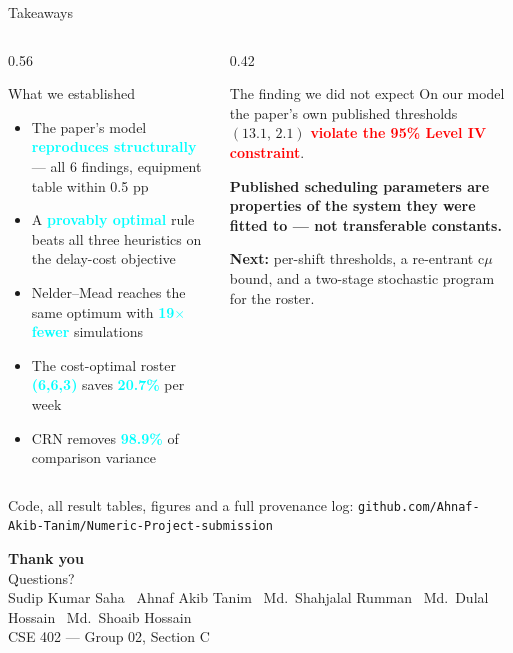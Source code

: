 \documentclass[aspectratio=169,11pt]{beamer}
\newcommand{\hl}[1]{\textcolor{deep}{\textbf{#1}}}
\newcommand{\good}[1]{\textcolor{aqua}{\textbf{#1}}}
\newcommand{\bad}[1]{\textcolor{red}{\textbf{#1}}}
\begin{document}
\begin{frame}{Takeaways}
\vspace{-0.2em}
\begin{columns}[T,onlytextwidth]
\begin{column}{0.56\textwidth}
\begin{block}{What we established}
\small
\begin{itemize}\setlength\itemsep{0.35em}
  \item The paper's model \good{reproduces structurally} --- all 6 findings,
        equipment table within 0.5 pp
  \item A \good{provably optimal} rule beats all three heuristics on the
        delay-cost objective
  \item Nelder--Mead reaches the same optimum with \good{19$\times$ fewer}
        simulations
  \item The cost-optimal roster \good{(6,6,3)} saves \good{20.7\%} per week
  \item CRN removes \good{98.9\%} of comparison variance
\end{itemize}
\end{block}
\end{column}
\begin{column}{0.42\textwidth}
\begin{block}{The finding we did not expect}
\small On our model the paper's own published thresholds $(13.1,\,2.1)$
\bad{violate the 95\% Level IV constraint}.
\vspace{0.4em}

\hl{Published scheduling parameters are properties of the system they were
fitted to --- not transferable constants.}
\end{block}
\vspace{0.4em}
{\footnotesize\textbf{Next:} per-shift thresholds, a re-entrant c$\mu$ bound,
and a two-stage stochastic program for the roster.}
\end{column}
\end{columns}
\vspace{0.6em}
\begin{center}\small\color{soft}
Code, all result tables, figures and a full provenance log:
\texttt{github.com/Ahnaf-Akib-Tanim/Numeric-Project-submission}
\end{center}
\end{frame}

{
\begin{frame}[plain]
\vfill
\begin{center}
{\Large\bfseries\color{deep} Thank you}\\[0.8em]
{\small Questions?}\\[1.6em]
{\footnotesize\color{soft}
Sudip Kumar Saha \textbullet\ Ahnaf Akib Tanim \textbullet\ Md.\ Shahjalal Rumman
\textbullet\ Md.\ Dulal Hossain \textbullet\ Md.\ Shoaib Hossain\\[0.3em]
CSE 402 --- Group 02, Section C}
\end{center}
\vfill
\end{frame}}
\end{document}
